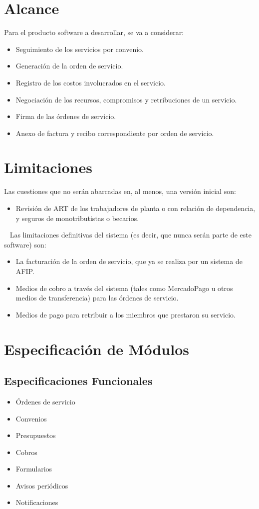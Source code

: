 \section{Alcance}
\normalsize{ \indent
Para el producto software a desarrollar, se va
a considerar:
}
\begin{itemize}
	\item Seguimiento de los servicios por
	convenio.
	\item Generaci\'on de la orden de servicio.
	\item Registro de los costos involucrados en
	el servicio.
	\item Negociaci\'on de los recursos,
	compromisos y retribuciones de un servicio.
	\item Firma de las \'ordenes de servicio.
	\item Anexo de factura y recibo
	correspondiente por orden de servicio.
\end{itemize}
\section{Limitaciones}
\normalsize{ \indent
Las cuestiones que no ser\'an abarcadas en, al
menos, una versi\'on inicial son:
}
\begin{itemize}
	\item Revisi\'on de ART de los trabajadores
	de planta o con relaci\'on de dependencia,
	y seguros de monotributistas o becarios.
\end{itemize}
\ \newline
\normalsize{ \indent
Las limitaciones definitivas del sistema (es
decir, que nunca ser\'an parte de este software)
son:
}
\begin{itemize}
	\item La facturaci\'on de la orden de
	servicio, que ya se realiza por un sistema
	de AFIP.
	\item Medios de cobro a trav\'es del sistema
	(tales como MercadoPago u otros medios de
	transferencia) para las \'ordenes de servicio.
	\item Medios de pago para retribuir a los
	miembros que prestaron su servicio.
\end{itemize}
\section{Especificaci\'on de M\'odulos}
\subsection[Funcionales]{Especificaciones Funcionales}
\begin{itemize}
	\item \'Ordenes de servicio
	\item Convenios
	\item Presupuestos
	\item Cobros
	\item Formularios
	\item Avisos peri\'odicos
	\item Notificaciones
\end{itemize}
